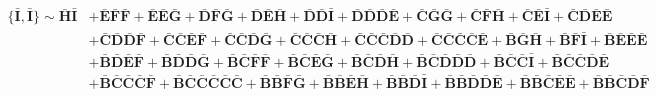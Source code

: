 \documentclass[10pt]{amsart}
\theoremstyle{definition}
\theoremstyle{corollary}
\theoremstyle{remark}
\theoremstyle{conclusion}
\begin{document}
\begin{align}
	\{\bar{\mathbf{I}}, \bar{\mathbf{I}}\} \sim \bar{\mathbf{H}}\bar{\mathbf{I}}&+\bar{\mathbf{E}}\bar{\mathbf{F}}\bar{\mathbf{F}}+\bar{\mathbf{E}}\bar{\mathbf{E}}\bar{\mathbf{G}}+\bar{\mathbf{D}}\bar{\mathbf{F}}\bar{\mathbf{G}}+\bar{\mathbf{D}}\bar{\mathbf{E}}\bar{\mathbf{H}}+\bar{\mathbf{D}}\bar{\mathbf{D}}\bar{\mathbf{I}}+\bar{\mathbf{D}}\bar{\mathbf{D}}\bar{\mathbf{D}}\bar{\mathbf{E}}+\bar{\mathbf{C}}\bar{\mathbf{G}}\bar{\mathbf{G}}+\bar{\mathbf{C}}\bar{\mathbf{F}}\bar{\mathbf{H}}+\bar{\mathbf{C}}\bar{\mathbf{E}}\bar{\mathbf{I}}+\bar{\mathbf{C}}\bar{\mathbf{D}}\bar{\mathbf{E}}\bar{\mathbf{E}} \nonumber \\
	&+\bar{\mathbf{C}}\bar{\mathbf{D}}\bar{\mathbf{D}}\bar{\mathbf{F}}+\bar{\mathbf{C}}\bar{\mathbf{C}}\bar{\mathbf{E}}\bar{\mathbf{F}}+\bar{\mathbf{C}}\bar{\mathbf{C}}\bar{\mathbf{D}}\bar{\mathbf{G}}+\bar{\mathbf{C}}\bar{\mathbf{C}}\bar{\mathbf{C}}\bar{\mathbf{H}}+\bar{\mathbf{C}}\bar{\mathbf{C}}\bar{\mathbf{C}}\bar{\mathbf{D}}\bar{\mathbf{D}}+\bar{\mathbf{C}}\bar{\mathbf{C}}\bar{\mathbf{C}}\bar{\mathbf{C}}\bar{\mathbf{E}}+\bar{\mathbf{B}}\bar{\mathbf{G}}\bar{\mathbf{H}}+\bar{\mathbf{B}}\bar{\mathbf{F}}\bar{\mathbf{I}}+\bar{\mathbf{B}}\bar{\mathbf{E}}\bar{\mathbf{E}}\bar{\mathbf{E}} \nonumber \\
	&+\bar{\mathbf{B}}\bar{\mathbf{D}}\bar{\mathbf{E}}\bar{\mathbf{F}}+\bar{\mathbf{B}}\bar{\mathbf{D}}\bar{\mathbf{D}}\bar{\mathbf{G}}+\bar{\mathbf{B}}\bar{\mathbf{C}}\bar{\mathbf{F}}\bar{\mathbf{F}}+\bar{\mathbf{B}}\bar{\mathbf{C}}\bar{\mathbf{E}}\bar{\mathbf{G}}+\bar{\mathbf{B}}\bar{\mathbf{C}}\bar{\mathbf{D}}\bar{\mathbf{H}}+\bar{\mathbf{B}}\bar{\mathbf{C}}\bar{\mathbf{D}}\bar{\mathbf{D}}\bar{\mathbf{D}}+\bar{\mathbf{B}}\bar{\mathbf{C}}\bar{\mathbf{C}}\bar{\mathbf{I}}+\bar{\mathbf{B}}\bar{\mathbf{C}}\bar{\mathbf{C}}\bar{\mathbf{D}}\bar{\mathbf{E}}\nonumber \\
	&+ \bar{\mathbf{B}}\bar{\mathbf{C}}\bar{\mathbf{C}}\bar{\mathbf{C}}\bar{\mathbf{F}}+\bar{\mathbf{B}}\bar{\mathbf{C}}\bar{\mathbf{C}}\bar{\mathbf{C}}\bar{\mathbf{C}}\bar{\mathbf{C}}+\bar{\mathbf{B}}\bar{\mathbf{B}}\bar{\mathbf{F}}\bar{\mathbf{G}}+\bar{\mathbf{B}}\bar{\mathbf{B}}\bar{\mathbf{E}}\bar{\mathbf{H}}+\bar{\mathbf{B}}\bar{\mathbf{B}}\bar{\mathbf{D}}\bar{\mathbf{I}}+\bar{\mathbf{B}}\bar{\mathbf{B}}\bar{\mathbf{D}}\bar{\mathbf{D}}\bar{\mathbf{E}}+\bar{\mathbf{B}}\bar{\mathbf{B}}\bar{\mathbf{C}}\bar{\mathbf{E}}\bar{\mathbf{E}}+\bar{\mathbf{B}}\bar{\mathbf{B}}\bar{\mathbf{C}}\bar{\mathbf{D}}\bar{\mathbf{F}}\nonumber \\

\end{align}
\end{document}
